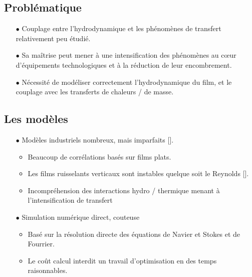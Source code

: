 \documentclass[a0,portrait]{a0poster}
\begin{document}
\begin{multicols}{2}
    \columnbreak

    \section*{Problématique}
    \begin{itemize}
    	\item[$\bullet$] Couplage entre l'hydrodynamique et les phénomènes de transfert relativement peu étudié.
    	\item[$\bullet$] Sa maîtrise peut mener à une intensification des phénomènes au cœur d'équipements technologiques et à la réduction de leur encombrement.
    	\item[$\bullet$] Nécessité de modéliser correctement l'hydrodynamique du film, et le couplage avec les transferts de chaleurs / de masse.
    \end{itemize}

    \subsection*{Les modèles}
    \begin{itemize}
	    \item[$\bullet$] Modèles industriels nombreux, mais imparfaits [\cite{Killion2001}].
    	\begin{itemize}
    		\item Beaucoup de corrélations basés sur films plats.
    		\item Les films ruisselants verticaux sont instables quelque soit le Reynolds [\textcite{Miller1998a}].
    		\item Incompréhension des interactions hydro / thermique menant à l'intensification de transfert
    	\end{itemize}
	    \item[$\bullet$] Simulation numérique direct, couteuse
    	\begin{itemize}
    		\item Basé sur la résolution directe des équations de Navier et Stokes et de Fourrier.
    		\item Le coût calcul interdit un travail d'optimisation en des temps raisonnables.
    	\end{itemize}
        \color{DarkRed}{
	    \item[$\bullet$] Modèles asymptotiques (méthode retenue)
    	\begin{itemize}
    		\item Basé un développement en couche limite adapté aux films ruisselants
    		\item Limité à un domaine de paramètres restreints (faible Reynolds et Peclet).
    		\item Travail important sur les équations en amont.
    	\end{itemize}
        }
    \end{itemize}
\end{multicols}
\end{document}
